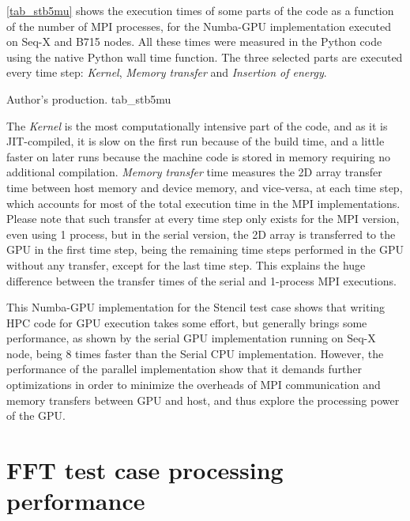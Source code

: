 \autoref {tab_stb5mu} shows the execution times of some parts of the code as a function of the number of MPI processes, for the Numba-GPU implementation executed on Seq-X and B715 nodes. All these times were measured in the Python code using the native Python wall time function. The three selected parts are executed every time step: \textit {Kernel}, \textit {Memory transfer} and \textit {Insertion of energy}. 

     {Author's production.} {tab_stb5mu}

The \textit {Kernel} is the most computationally intensive part of the code, and as it is JIT-compiled, it is slow on the first run because of the build time, and a little faster on later runs because the machine code is stored in memory requiring no additional compilation. \textit {Memory transfer} time measures the 2D array transfer time between host memory and device memory, and vice-versa, at each time step, which accounts for most of the total execution time in the MPI implementations. Please note that such transfer at every time step only exists for the MPI version, even using 1 process, but in the serial version, the 2D array is transferred to the GPU in the first time step, being the remaining time steps performed in the GPU without any transfer, except for the last time step. This explains the huge difference between the transfer times of the serial and 1-process MPI executions. 

This Numba-GPU implementation for the Stencil test case shows that writing HPC code for GPU execution takes some effort, but generally brings some performance, as shown by the serial GPU implementation running on Seq-X node, being 8 times faster than the Serial CPU implementation. However, the performance of the parallel implementation show that it demands further optimizations in order to minimize the overheads of MPI communication and memory transfers between GPU and host, and thus explore the processing power of the GPU. 

%
%
%
%
%
%
%
\section{FFT test case processing performance}
\label{sec_analfft}

